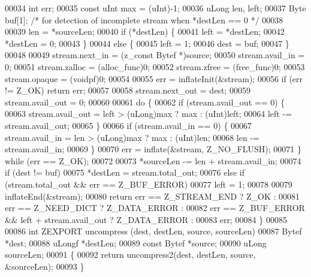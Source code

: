 \begin{DoxyCode}
00034     \textcolor{keywordtype}{int} err;
00035     \textcolor{keyword}{const} uInt max = (uInt)-1;
00036     uLong len, left;
00037     Byte buf[1];    \textcolor{comment}{/* for detection of incomplete stream when *destLen == 0 */}
00038 
00039     len = *sourceLen;
00040     \textcolor{keywordflow}{if} (*destLen) \{
00041         left = *destLen;
00042         *destLen = 0;
00043     \}
00044     \textcolor{keywordflow}{else} \{
00045         left = 1;
00046         dest = buf;
00047     \}
00048 
00049     stream.next\_in = (z\_const Bytef *)source;
00050     stream.avail\_in = 0;
00051     stream.zalloc = (alloc\_func)0;
00052     stream.zfree = (free\_func)0;
00053     stream.opaque = (voidpf)0;
00054 
00055     err = inflateInit(&stream);
00056     \textcolor{keywordflow}{if} (err != Z\_OK) \textcolor{keywordflow}{return} err;
00057 
00058     stream.next\_out = dest;
00059     stream.avail\_out = 0;
00060 
00061     \textcolor{keywordflow}{do} \{
00062         \textcolor{keywordflow}{if} (stream.avail\_out == 0) \{
00063             stream.avail\_out = left > (uLong)max ? max : (uInt)left;
00064             left -= stream.avail\_out;
00065         \}
00066         \textcolor{keywordflow}{if} (stream.avail\_in == 0) \{
00067             stream.avail\_in = len > (uLong)max ? max : (uInt)len;
00068             len -= stream.avail\_in;
00069         \}
00070         err = inflate(&stream, Z\_NO\_FLUSH);
00071     \} \textcolor{keywordflow}{while} (err == Z\_OK);
00072 
00073     *sourceLen -= len + stream.avail\_in;
00074     \textcolor{keywordflow}{if} (dest != buf)
00075         *destLen = stream.total\_out;
00076     \textcolor{keywordflow}{else} \textcolor{keywordflow}{if} (stream.total\_out && err == Z\_BUF\_ERROR)
00077         left = 1;
00078 
00079     inflateEnd(&stream);
00080     \textcolor{keywordflow}{return} err == Z\_STREAM\_END ? Z\_OK :
00081            err == Z\_NEED\_DICT ? Z\_DATA\_ERROR  :
00082            err == Z\_BUF\_ERROR && left + stream.avail\_out ? Z\_DATA\_ERROR :
00083            err;
00084 \}
00085 
00086 \textcolor{keywordtype}{int} ZEXPORT uncompress (dest, destLen, source, sourceLen)
00087     Bytef *dest;
00088     uLongf *destLen;
00089     \textcolor{keyword}{const} Bytef *source;
00090     uLong sourceLen;
00091 \{
00092     \textcolor{keywordflow}{return} uncompress2(dest, destLen, source, &sourceLen);
00093 \}
\end{DoxyCode}
